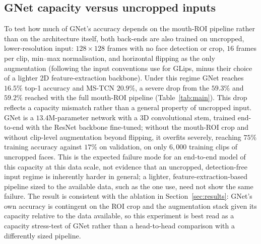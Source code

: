 \documentclass[10pt, a4paper]{article}
\begin{document}
\subsection{GNet capacity versus uncropped inputs}
\label{sec:ameer}
\noindent To test how much of GNet's accuracy depends on the mouth-ROI pipeline rather than on the architecture itself, both back-ends are also trained on uncropped, lower-resolution input: $128\times128$ frames with no face detection or crop, $16$ frames per clip, min--max normalisation, and horizontal flipping as the only augmentation (following the input conventions \citet{ameer2024} use for GLips, minus their choice of a lighter 2D feature-extraction backbone). Under this regime GNet reaches $16.5\%$ top-1 accuracy and MS-TCN $20.9\%$, a severe drop from the $59.3\%$ and $59.2\%$ reached with the full mouth-ROI pipeline (Table~\ref{tab:main}).
\noindent This drop reflects a capacity mismatch rather than a general property of uncropped input. GNet is a $13.4$M-parameter network with a 3D convolutional stem, trained end-to-end with the ResNet backbone fine-tuned; without the mouth-ROI crop and without clip-level augmentation beyond flipping, it overfits severely, reaching $75\%$ training accuracy against $17\%$ on validation, on only $6{,}000$ training clips of uncropped faces. This is the expected failure mode for an end-to-end model of this capacity at this data scale, not evidence that an uncropped, detection-free input regime is inherently harder in general; a lighter, feature-extraction-based pipeline sized to the available data, such as the one \citet{ameer2024} use, need not show the same failure. The result is consistent with the ablation in Section~\ref{sec:results}: GNet's own accuracy is contingent on the ROI crop and the augmentation stack given its capacity relative to the data available, so this experiment is best read as a capacity stress-test of GNet rather than a head-to-head comparison with a differently sized pipeline.
\end{document}
